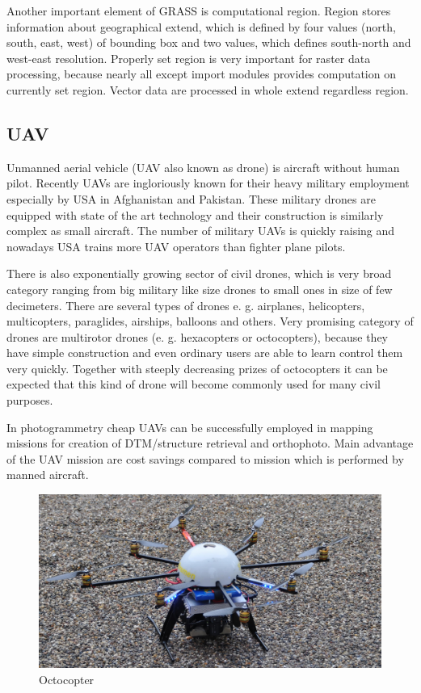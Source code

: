 \documentclass[a4paper,12pt]{article}
\begin{document}
Another important element of GRASS is computational region. Region stores information about geographical
extend, which is defined by four values (north, south, east, west) of bounding box and 
two values, which defines south-north and west-east resolution. Properly set region is 
very important for raster data processing, because nearly all except import modules provides computation 
on currently set region. Vector data are processed in whole extend regardless region.

\subsection{UAV}

Unmanned aerial vehicle (UAV also known as drone) is aircraft without human pilot. Recently UAVs are ingloriously known for
their heavy military employment especially by USA in Afghanistan and Pakistan. These military drones are equipped with state of the art 
technology and their construction is similarly complex as small aircraft.  
The number of military UAVs is quickly raising and nowadays USA trains more UAV operators than fighter plane pilots.

There is also exponentially growing sector of civil drones, which is very broad category ranging
from big military like size drones to small ones in size of few decimeters. There are several types of drones e. g. airplanes,
helicopters, multicopters, paraglides, airships, balloons and others. 
Very promising category of drones are multirotor drones (e. g. hexacopters or octocopters), because they have simple construction and 
even ordinary users are able to learn control them very quickly. Together with steeply decreasing prizes of octocopters it can be expected 
that this kind of drone will become commonly used for many civil purposes.

In photogrammetry cheap UAVs can be successfully employed in mapping missions for creation of DTM/structure retrieval and orthophoto.
Main advantage of the UAV mission are cost savings compared to mission which is performed by manned aircraft.


\begin{figure}[h]
    \centering
    \includegraphics[scale=0.8]{figures/octocopter.jpg}
    \caption{Octocopter \cite{boe2013octocopter}}
    \label{fig:sample_figure}
\end{figure}
\end{document}
